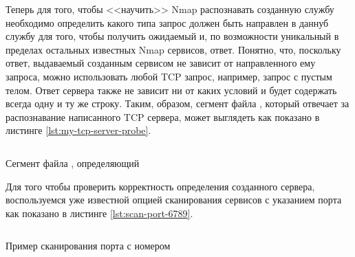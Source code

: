 Теперь для того, чтобы <<научить>> Nmap распознавать созданную службу необходимо определить какого типа запрос должен быть направлен
в даннуб службу для того, чтобы получить ожидаемый и, по возможности уникальный в пределах остальных известных Nmap сервисов, ответ.
Понятно, что, поскольку ответ, выдаваемый созданным сервисом не зависит от направленного ему запроса, можно использовать любой
TCP запрос, например, запрос с пустым телом. Ответ сервера также не зависит ни от каких условий и будет содержать всегда одну и ту
же строку. Таким, образом, сегмент файла , который отвечает за распознавание написанного TCP сервера,
может выглядеть как показано в листинге \ref{lst:my-tcp-server-probe}.

\begin{listing}[H]
    \inputminted{console}{resources/08_nmap_service_probes}
    \caption{Сегмент файла , определяющий }
    \label{lst:my-tcp-server-probe}
\end{listing}

Для того чтобы проверить корректность определения созданного сервера, воспользуемся уже известной опцией сканирования сервисов с
указанием порта как показано в листинге \ref{lst:scan-port-6789}.

\begin{listing}[H]
    \inputminted{console}{resources/09_scan_port_6789}
    \caption{Пример сканирования порта с номером }
    \label{lst:scan-port-6789}
\end{listing}